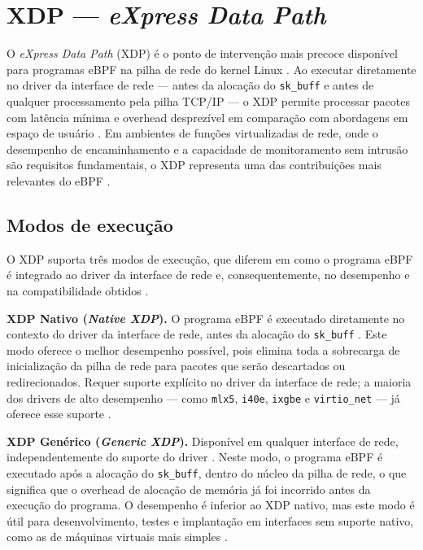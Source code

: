 \chapter{XDP --- \textit{eXpress Data Path}}
\label{cap:xdp}

O \textit{eXpress Data Path} (XDP) é o ponto de intervenção mais precoce
disponível para programas eBPF na pilha de rede do kernel Linux \cite{linuxkernel2024}.
Ao executar diretamente no driver da interface de rede --- antes da alocação do
\texttt{sk\_buff} e antes de qualquer processamento pela pilha TCP/IP --- o XDP
permite processar pacotes com latência mínima e overhead desprezível em comparação
com abordagens em espaço de usuário \cite{cassagnes2020}.
Em ambientes de funções virtualizadas de rede, onde o desempenho de encaminhamento
e a capacidade de monitoramento sem intrusão são requisitos fundamentais, o XDP
representa uma das contribuições mais relevantes do eBPF \cite{venancio2021}.

\section{Modos de execução}
\label{sec:xdp-modos}

O XDP suporta três modos de execução, que diferem em como o programa eBPF é
integrado ao driver da interface de rede e, consequentemente, no desempenho
e na compatibilidade obtidos \cite{linuxkernel2024}.

\textbf{XDP Nativo (\textit{Native XDP}).}
O programa eBPF é executado diretamente no contexto do driver da interface de rede,
antes da alocação do \texttt{sk\_buff} \cite{linuxkernel2024}.
Este modo oferece o melhor desempenho possível, pois elimina toda a sobrecarga
de inicialização da pilha de rede para pacotes que serão descartados ou
redirecionados.
Requer suporte explícito no driver da interface de rede; a maioria dos drivers
de alto desempenho --- como \texttt{mlx5}, \texttt{i40e}, \texttt{ixgbe} e
\texttt{virtio\_net} --- já oferece esse suporte \cite{gregg2019}.

\textbf{XDP Genérico (\textit{Generic XDP}).}
Disponível em qualquer interface de rede, independentemente do suporte do driver
\cite{linuxkernel2024}.
Neste modo, o programa eBPF é executado após a alocação do \texttt{sk\_buff},
dentro do núcleo da pilha de rede, o que significa que o overhead de alocação
de memória já foi incorrido antes da execução do programa.
O desempenho é inferior ao XDP nativo, mas este modo é útil para desenvolvimento,
testes e implantação em interfaces sem suporte nativo, como as de máquinas
virtuais mais simples \cite{gregg2020}.

